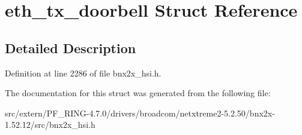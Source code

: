 \hypertarget{structeth__tx__doorbell}{
\section{eth\_\-tx\_\-doorbell Struct Reference}
\label{structeth__tx__doorbell}
}


\subsection{Detailed Description}


Definition at line 2286 of file bnx2x\_\-hsi.h.



The documentation for this struct was generated from the following file:\begin{DoxyCompactItemize}
\item 
src/extern/PF\_\-RING-\/4.7.0/drivers/broadcom/netxtreme2-\/5.2.50/bnx2x-\/1.52.12/src/bnx2x\_\-hsi.h\end{DoxyCompactItemize}
